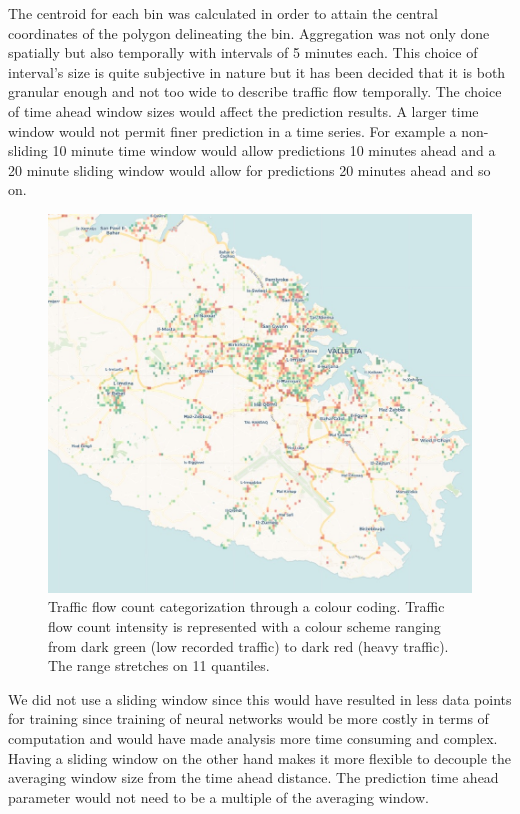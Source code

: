 \documentclass[12pt, a4paper]{report}
\theoremstyle{definition}
\theoremstyle{definition}%
\theoremstyle{definition}%
\theoremstyle{definition}%
\theoremstyle{definition}%
\theoremstyle{definition}%
\begin{document}
The centroid for each bin was calculated in order to attain the central coordinates of the polygon delineating the bin. Aggregation was not only done spatially but also temporally with intervals of 5 minutes each. This choice of interval's size is quite subjective in nature but it has been decided that it is both granular enough and not too wide to describe traffic flow temporally.  The choice of time ahead window sizes would affect the prediction results. A larger time window would not permit finer prediction in a time series. For example a non-sliding 10 minute time window would allow predictions 10 minutes ahead and a 20 minute sliding window would allow for predictions 20 minutes ahead and so on.

\begin{figure}[!]	
	\includegraphics[scale=0.5]{traffic_count_color_coded_categorization.jpg}
	\centering
	\caption[Traffic total flow count binning]{Traffic flow count categorization through a colour coding. Traffic flow count intensity is represented with a colour scheme ranging from dark green (low recorded traffic) to dark red (heavy traffic). The range stretches on 11 quantiles.}
	\label{fig:traffic_count_color_coded_categorization}
\end{figure}

We did not use a sliding window since this would have resulted in less data points for training since training of neural networks would be more costly in terms of computation and would have made analysis more time consuming and complex. Having a sliding window on the other hand makes it more flexible to decouple the averaging window size from the time ahead distance. The prediction time ahead parameter would not need to be a multiple of the averaging window.
\end{document}
